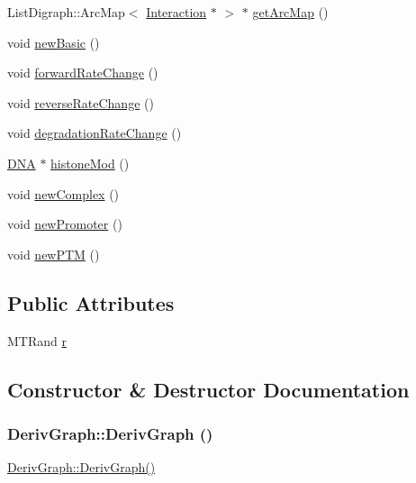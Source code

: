 \begin{DoxyCompactItemize}
ListDigraph::ArcMap$<$ \hyperlink{classInteraction}{Interaction} $\ast$ $>$ $\ast$ \hyperlink{classDerivGraph_a5ff2dac34f1cdcc4b4abfc26f13da1ab}{getArcMap} ()
\item 
void \hyperlink{classDerivGraph_a8862d4f9ebbd3eced9d56a81fe91c4fb}{newBasic} ()
\item 
void \hyperlink{classDerivGraph_afbda567a3f51d05fad37eb46fc121a89}{forwardRateChange} ()
\item 
void \hyperlink{classDerivGraph_aae8c58e1d6be852efbe1ed6593f31eca}{reverseRateChange} ()
\item 
void \hyperlink{classDerivGraph_a038841806aa1fe80a9450f977baa1fd2}{degradationRateChange} ()
\item 
\hyperlink{classDNA}{DNA} $\ast$ \hyperlink{classDerivGraph_ae39d9acba4901f668d8a85c88bfcc21a}{histoneMod} ()
\item 
void \hyperlink{classDerivGraph_a4be722e989002430ca7c363dce500638}{newComplex} ()
\item 
void \hyperlink{classDerivGraph_aa55a36103c33d4f1bd57de797bcd45cb}{newPromoter} ()
\item 
void \hyperlink{classDerivGraph_a83937a5c3ed427ebaad2bf23260c0352}{newPTM} ()
\end{DoxyCompactItemize}
\subsection*{Public Attributes}
\begin{DoxyCompactItemize}
\item 
MTRand \hyperlink{classDerivGraph_a2d5931b4ca8a9c6e0c013a74a5cfbc7c}{r}
\end{DoxyCompactItemize}


\subsection{Constructor \& Destructor Documentation}
\hypertarget{classDerivGraph_af2a1f80b96b4657e7575748942d09947}{
\subsubsection[{DerivGraph}]{\setlength{\rightskip}{0pt plus 5cm}DerivGraph::DerivGraph ()}}
\label{classDerivGraph_af2a1f80b96b4657e7575748942d09947}
\hyperlink{classDerivGraph_af2a1f80b96b4657e7575748942d09947}{DerivGraph::DerivGraph()}

